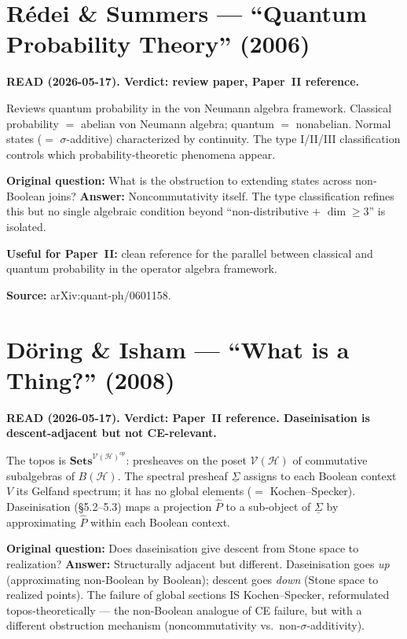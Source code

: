 \section{R\'{e}dei \& Summers --- ``Quantum Probability Theory''
(2006)}

\textbf{READ (2026-05-17).  Verdict: review paper, Paper~II
reference.}

\medskip\noindent
Reviews quantum probability in the von Neumann algebra framework.
Classical probability $=$ abelian von Neumann algebra; quantum $=$
nonabelian.  Normal states ($=$ $\sigma$-additive) characterized
by continuity.  The type I/II/III classification controls which
probability-theoretic phenomena appear.

\medskip\noindent
\textbf{Original question:} What is the obstruction to extending
states across non-Boolean joins?  \textbf{Answer:}
Noncommutativity itself.  The type classification refines this
but no single algebraic condition beyond ``non-distributive
$+$ $\dim \geq 3$'' is isolated.

\medskip\noindent
\textbf{Useful for Paper~II:} clean reference for the parallel
between classical and quantum probability in the operator algebra
framework.

\medskip\noindent
\textbf{Source:} arXiv:quant-ph/0601158.

\section{D\"{o}ring \& Isham --- ``What is a Thing?'' (2008)}

\textbf{READ (2026-05-17).  Verdict: Paper~II reference.
Daseinisation is descent-adjacent but not CE-relevant.}

\medskip\noindent
The topos is $\mathbf{Sets}^{\mathcal{V}(\mathcal{H})^{op}}$:
presheaves on the poset $\mathcal{V}(\mathcal{H})$ of commutative
subalgebras of $B(\mathcal{H})$.  The spectral presheaf $\underline{\Sigma}$
assigns to each Boolean context $V$ its Gelfand spectrum; it has
no global elements ($=$ Kochen--Specker).  Daseinisation (\S 5.2--5.3)
maps a projection $\hat{P}$ to a sub-object of $\underline{\Sigma}$
by approximating $\hat{P}$ within each Boolean context.

\medskip\noindent
\textbf{Original question:} Does daseinisation give descent from
Stone space to realization?  \textbf{Answer:} Structurally adjacent
but different.  Daseinisation goes \emph{up} (approximating
non-Boolean by Boolean); descent goes \emph{down} (Stone space to
realized points).  The failure of global sections IS Kochen--Specker,
reformulated topos-theoretically --- the non-Boolean analogue of CE
failure, but with a different obstruction mechanism
(noncommutativity vs.\ non-$\sigma$-additivity).

